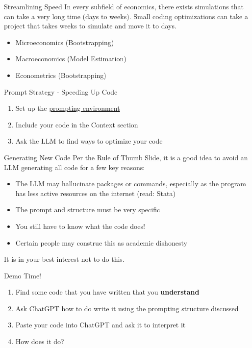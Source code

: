 \documentclass[
	11pt, %
	aspectratio=169, %
]{beamer}
\begin{document}
\begin{frame}{Streamlining Speed}
    In every subfield of economics, there exists simulations that can take a very long time (days to weeks). Small coding optimizations can take a project that takes weeks to simulate and move it to days. 
    \vspace{15pt}
    \begin{itemize}
        \setlength{\itemsep}{20pt}
        \item Microeconomics (Bootstrapping)
        \item Macroeconomics (Model Estimation)
        \item Econometrics (Bootstrapping)
    \end{itemize}
    
\end{frame}
\begin{frame}{Prompt Strategy - Speeding Up Code}
    \begin{enumerate}
        \setlength{\itemsep}{20pt}
        \item Set up the \hyperlink{Prompt Structure}{prompting environment}
        \item Include your code in the \alert{Context} section
        \item Ask the LLM to find ways to optimize your code
    \end{enumerate}
\end{frame}
\begin{frame}{Generating New Code}
    Per the \hyperlink{Rule of Thumb}{Rule of Thumb Slide}, it is a good idea to avoid an LLM generating all code for a few key reasons:
    \begin{itemize}
        \setlength{\itemsep}{20pt}
        \item The LLM may hallucinate packages or commands, especially as the program has less active resources on the internet (read: \alert{Stata}) 
        \item The prompt and structure must be very specific
        \item You still have to know what the code does! 
        \item Certain people may construe this as academic dishonesty
    \end{itemize}
    \alert{It is in your best interest not to do this.}
\end{frame}
\begin{frame}{Demo Time!}
    \begin{enumerate}
        \setlength{\itemsep}{20pt}
        \item Find some code that you have written that you \textbf{understand}
        \item Ask ChatGPT how to do write it using the prompting structure discussed
        \item Paste your code into ChatGPT and ask it to interpret it
        \item How does it do?
    \end{enumerate}
\end{frame}
\end{document}
